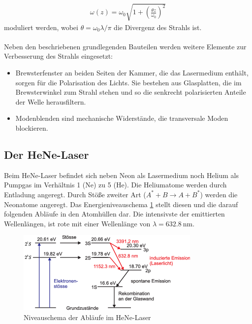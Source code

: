 \begin{align}
	\omega(z) = \omega_0\sqrt{1+\left(\frac{\theta z}{\omega_0}\right)^2}
\end{align}
moduliert werden, wobei $\theta = \omega_0\lambda\slash\pi$ die Divergenz des Strahls ist. \\
\ \\
Neben den beschriebenen grundlegenden Bauteilen werden weitere Elemente zur Verbesserung des Strahls eingesetzt:
\begin{itemize}
	\item Brewsterfenster an beiden Seiten der Kammer, die das Lasermedium enthält, sorgen für die Polarisation des Lichts. Sie bestehen aus Glasplatten, die im Brewsterwinkel zum Strahl stehen und so die senkrecht polarisierten Anteile der Welle herausfiltern.
	\item Modenblenden sind mechanische Widerstände, die transversale Moden blockieren.
\end{itemize}
\subsection{Der HeNe-Laser}
Beim HeNe-Laser befindet sich neben Neon als Lasermedium noch Helium als Pumpgas im Verhältnis 1 (Ne) zu 5 (He). Die Heliumatome werden durch Entladung angeregt. Durch Stöße zweiter Art ($A^* + B \rightarrow A + B^*$) werden die Neonatome angeregt. Das Energieniveauschema \ref{fig:Niveaus} stellt diesen und die darauf folgenden Abläufe in den Atomhüllen dar. Die intensivste der emittierten Wellenlängen, ist rote mit einer Wellenlänge von $\lambda = \SI{632.8}{\nano\metre}$.
\begin{figure}[h!]
	\centering
	\includegraphics[width=.6\textwidth]{Niveauschema.png}
	\caption{Niveauschema der Abläufe im HeNe-Laser \cite{Niveaus}}
	\label{fig:Niveaus}
\end{figure}